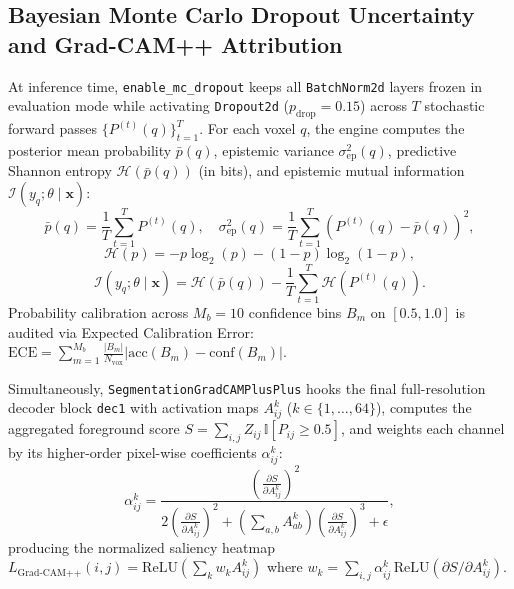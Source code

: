 \documentclass[conference]{IEEEtran}
\begin{document}
\subsection{Bayesian Monte Carlo Dropout Uncertainty and Grad-CAM++ Attribution}
At inference time, \texttt{enable\_mc\_dropout} keeps all \texttt{BatchNorm2d} layers frozen in evaluation mode while activating \texttt{Dropout2d} ($p_{\text{drop}} = 0.15$) across $T$ stochastic forward passes $\{P^{(t)}(q)\}_{t=1}^T$. For each voxel $q$, the engine computes the posterior mean probability $\bar{p}(q)$, epistemic variance $\sigma_{\text{ep}}^2(q)$, predictive Shannon entropy $\mathcal{H}(\bar{p}(q))$ (in bits), and epistemic mutual information $\mathcal{I}(y_q; \theta \mid \mathbf{x})$:
\begin{equation}
    \bar{p}(q) = \frac{1}{T}\sum_{t=1}^{T} P^{(t)}(q), \quad \sigma_{\text{ep}}^2(q) = \frac{1}{T}\sum_{t=1}^{T}\!\left(P^{(t)}(q) - \bar{p}(q)\right)^2,
    \label{eq:mc_mean_var}
\end{equation}
\begin{equation}
    \mathcal{H}(p) = -p\log_2(p) - (1-p)\log_2(1-p),
    \label{eq:shannon}
\end{equation}
\begin{equation}
    \mathcal{I}(y_q; \theta \mid \mathbf{x}) = \mathcal{H}\!\left(\bar{p}(q)\right) - \frac{1}{T}\sum_{t=1}^{T}\mathcal{H}\!\left(P^{(t)}(q)\right).
    \label{eq:mutual_info}
\end{equation}
Probability calibration across $M_b = 10$ confidence bins $B_m$ on $[0.5, 1.0]$ is audited via Expected Calibration Error: $\text{ECE} = \sum_{m=1}^{M_b} \frac{|B_m|}{N_{\text{vox}}} |\text{acc}(B_m) - \text{conf}(B_m)|$.

Simultaneously, \texttt{SegmentationGradCAMPlusPlus} hooks the final full-resolution decoder block \texttt{dec1} with activation maps $A^k_{ij}$ ($k \in \{1,\dots,64\}$), computes the aggregated foreground score $S = \sum_{i,j} Z_{ij}\,\mathbb{I}[P_{ij} \ge 0.5]$, and weights each channel by its higher-order pixel-wise coefficients $\alpha^{k}_{ij}$:
\begin{equation}
    \alpha^{k}_{ij} = \frac{\left(\frac{\partial S}{\partial A^k_{ij}}\right)^2}{2\left(\frac{\partial S}{\partial A^k_{ij}}\right)^2 + \left(\sum_{a,b} A^k_{ab}\right)\left(\frac{\partial S}{\partial A^k_{ij}}\right)^3 + \epsilon},
    \label{eq:gradcampp}
\end{equation}
producing the normalized saliency heatmap $L_{\text{Grad-CAM++}}(i,j) = \text{ReLU}\!\left(\sum_k w_k A^k_{ij}\right)$ where $w_k = \sum_{i,j} \alpha^k_{ij}\,\text{ReLU}(\partial S / \partial A^k_{ij})$.
\end{document}

